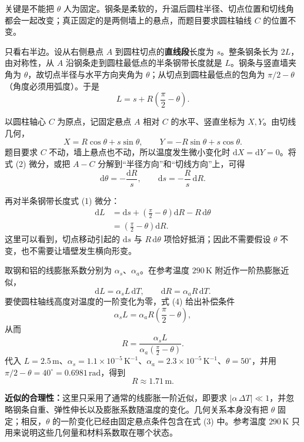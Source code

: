 \begin{solution}
关键是不能把 $\theta$ 人为固定。钢条是柔软的，升温后圆柱半径、切点位置和切线角都会一起改变；真正固定的是两侧墙上的悬点，而题目要求圆柱轴线 $C$ 的位置不变。

只看右半边。设从右侧悬点 $A$ 到圆柱切点的\textbf{直线段}长度为 $s$。整条钢条长为 $2L$，由对称性，从 $A$ 沿钢条走到圆柱最低点的半条钢带长度就是 $L$。钢条与竖直墙夹角为 $\theta$，故切点半径与水平方向夹角为 $\theta$；从切点到圆柱最低点的包角为 $\pi/2-\theta$（角度必须用弧度）。于是
\[
L=s+R\left(\frac{\pi}{2}-\theta\right). \tag{1}
\]

以圆柱轴心 $C$ 为原点，记固定悬点 $A$ 相对 $C$ 的水平、竖直坐标为 $X,Y$。由切线几何，
\[
X=R\cos\theta+s\sin\theta,\qquad
Y=-R\sin\theta+s\cos\theta. \tag{2}
\]
题目要求 $C$ 不动，墙上悬点也不动，所以温度发生微小变化时 $\mathrm{d}X=\mathrm{d}Y=0$。将式 (2) 微分，或把 $A-C$ 分解到“半径方向”和“切线方向”上，可得
\[
\mathrm{d}\theta=-\frac{\mathrm{d}R}{s},\qquad
\mathrm{d}s=-\frac{R}{s}\,\mathrm{d}R. \tag{3}
\]

再对半条钢带长度式 (1) 微分：
\[
\begin{aligned}
\mathrm{d}L
 &=\mathrm{d}s+\left(\frac{\pi}{2}-\theta\right)\mathrm{d}R-R\,\mathrm{d}\theta\\
 &=\left(\frac{\pi}{2}-\theta\right)\mathrm{d}R.
\end{aligned} \tag{4}
\]
这里可以看到，切点移动引起的 $\mathrm{d}s$ 与 $R\,\mathrm{d}\theta$ 项恰好抵消；因此不需要假设 $\theta$ 不变，也不需要让墙壁发生横向形变。

取钢和铝的线膨胀系数分别为 $\alpha_s$、$\alpha_a$。在参考温度 $290\,\mathrm K$ 附近作一阶热膨胀近似，
\[
\mathrm{d}L=\alpha_s L\,\mathrm{d}T,\qquad
\mathrm{d}R=\alpha_a R\,\mathrm{d}T.
\]
要使圆柱轴线高度对温度的一阶变化为零，式 (4) 给出补偿条件
\[
\alpha_s L
 =\alpha_a R\left(\frac{\pi}{2}-\theta\right),
\]
从而
\[
\boxed{
R=\frac{\alpha_s L}
        {\alpha_a\left(\frac{\pi}{2}-\theta\right)} }.
\]
代入 $L=2.5\,\mathrm m$、$\alpha_s=1.1\times10^{-5}\,\mathrm{K^{-1}}$、$\alpha_a=2.3\times10^{-5}\,\mathrm{K^{-1}}$、$\theta=50^\circ$，并用
$\pi/2-\theta=40^\circ=0.6981\,\mathrm{rad}$，得到
\[
\boxed{R\approx1.71\,\mathrm m}.
\]

\textbf{近似的合理性：}这里只采用了通常的线膨胀一阶近似，即要求 $|\alpha\,\Delta T|\ll1$，并忽略钢条自重、弹性伸长以及膨胀系数随温度的变化。几何关系本身没有把 $\theta$ 固定；相反，$\theta$ 的一阶变化已经由固定悬点条件包含在式 (3) 中。参考温度 $290\,\mathrm K$ 只用来说明这些几何量和材料系数取在哪个状态。
\end{solution}

